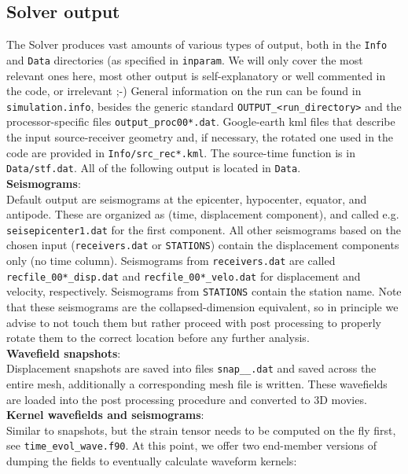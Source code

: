 \documentclass[11pt,letter,fleqn,english,notitlepage]{article}
\begin{document}
\subsection{Solver output}
The Solver produces vast amounts of various types of output, 
both in the {\tt Info} and {\tt Data} directories (as specified in {\tt inparam}. We will 
only cover the most relevant ones here, most other output is self-explanatory 
or well commented in the code, or irrelevant ;-)
General information on the run can be found in {\tt simulation.info}, besides 
the generic standard {\tt OUTPUT\_<run\_directory>} and the processor-specific files
{\tt output\_proc00*.dat}. Google-earth kml files that describe the input source-receiver
geometry and, if necessary, the rotated one used in the code are provided in {\tt Info/src\_rec*.kml}.
The source-time function is in {\tt Data/stf.dat}. All of the following output is located in {\tt Data}.\\

\noindent \textbf{Seismograms}: \\
Default output are seismograms at the epicenter, hypocenter,
equator, and antipode. These are organized as (time, displacement component), and 
called e.g. {\tt seisepicenter1.dat} for the first component.
All other seismograms based on the chosen input 
({\tt receivers.dat} or {\tt STATIONS}) contain the displacement 
components only (no time column). Seismograms from {\tt receivers.dat} are called 
{\tt recfile\_00*\_disp.dat} and {\tt recfile\_00*\_velo.dat} for displacement and velocity, respectively.
Seismograms from {\tt STATIONS} contain the station name. Note that these seismograms 
are the collapsed-dimension equivalent, so in principle we advise to not touch them but 
rather proceed with post processing to properly rotate them to the correct location before 
any further analysis.\\

\noindent \textbf{Wavefield snapshots}:\\
Displacement snapshots are saved into files {\tt snap\_<proc number>\_<time sample>.dat}
and saved across the entire mesh, additionally a corresponding mesh file is written.
These wavefields are loaded into the post processing procedure and converted to 3D 
movies.\\

\noindent \textbf{Kernel wavefields and seismograms}: \\
Similar to snapshots, but the strain tensor needs 
to be computed on the fly first, see {\tt time\_evol\_wave.f90}. 
At this point, we offer two end-member versions of dumping the fields  
to eventually calculate waveform kernels:
\end{document}
